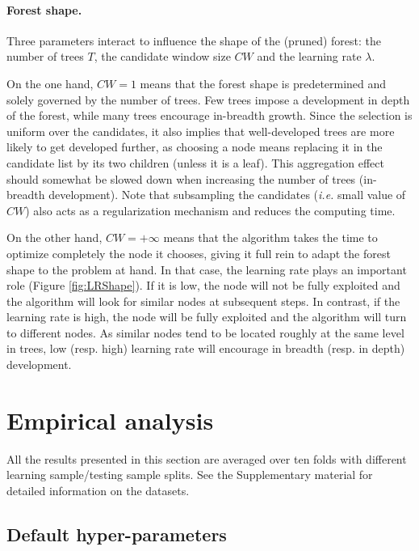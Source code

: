 \documentclass{article}
\begin{document}
\paragraph{Forest shape.}
Three parameters interact to influence the shape of the (pruned)
forest: the number of trees $T$, the candidate window size $CW$ and
the learning rate $\lambda$.

On the one hand, $CW=1$ means that the forest shape is predetermined and 
solely governed by the number of trees. Few trees impose a development in 
depth of the forest, while many trees encourage in-breadth growth. Since the 
selection is uniform over the candidates, it also implies that well-developed 
trees are more likely to get developed further, as choosing a node means 
replacing it in the candidate list by its two children (unless it is a leaf). 
This aggregation effect should somewhat be slowed down when increasing the 
number of trees (in-breadth development). Note that subsampling the candidates 
({\it i.e.} small value of $CW$)
also acts as a regularization mechanism and reduces the computing time.

On the other hand, $CW=+\infty$ means that the algorithm takes the
time to optimize completely the node it chooses, giving it full rein
to adapt the forest shape to the problem at hand. In that case, the
learning rate plays an important role (Figure \ref{fig:LRShape}). If
it is low, the node will not be fully exploited and the algorithm will
look for similar nodes at subsequent steps.  In contrast, if the
learning rate is high, the node will be fully exploited and the
algorithm will turn to different nodes.  As similar nodes tend to be
located roughly at the same level in trees, low (resp. high) learning
rate will encourage in breadth (resp. in depth) development.



\section{Empirical analysis}
\label{sec:analysis}

All the results presented in this section are averaged over ten folds
with different learning sample/testing sample splits. See the Supplementary 
material for detailed information on the datasets.

\subsection{Default hyper-parameters}
\label{subsec:defaultHP}
\end{document}
